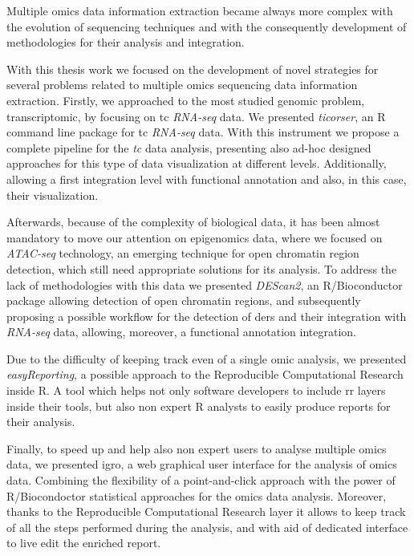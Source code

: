 Multiple omics data information extraction became always more complex with the evolution of sequencing techniques and with the consequently development of methodologies for their analysis and integration.

With this thesis work we focused on the development of novel strategies for several problems related to multiple omics sequencing data information extraction.
Firstly, we approached to the most studied genomic problem, transcriptomic, by focusing on \gls{tc} \textit{RNA-seq} data.
We presented \textit{ticorser}, an R command line package for \gls{tc} \textit{RNA-seq} data.
With this instrument we propose a complete pipeline for the \textit{tc} data analysis, presenting also ad-hoc designed approaches for this type of data visualization at different levels.
Additionally, allowing a first integration level with functional annotation and also, in this case, their visualization.

Afterwards, because of the complexity of biological data, it has been almost mandatory to move our attention on epigenomics data, where we focused on \textit{ATAC-seq} technology, an emerging technique for open chromatin region detection, which still need appropriate solutions for its analysis.
To address the lack of methodologies with this data we presented \textit{DEScan2}, an R/Bioconductor package allowing detection of open chromatin regions, and subsequently proposing a possible workflow for the detection of \glspl{der} and their integration with \textit{RNA-seq} data, allowing, moreover, a functional annotation integration.

Due to the difficulty of keeping track even of a single omic analysis, we presented \textit{easyReporting}, a possible approach to the Reproducible Computational Research inside R.
A tool which helps not only software developers to include \gls{rr} layers inside their tools, but also non expert R analysts to easily produce reports for their analysis.

Finally, to speed up and help also non expert users to analyse multiple omics data, we presented \gls{igro}, a web graphical user interface for the analysis of omics data.
Combining the flexibility of a point-and-click approach with the power of R/Biocondoctor statistical approaches for the omics data analysis.
Moreover, thanks to the Reproducible Computational Research layer it allows to keep track of all the steps performed during the analysis, and with aid of dedicated interface to live edit the enriched report.